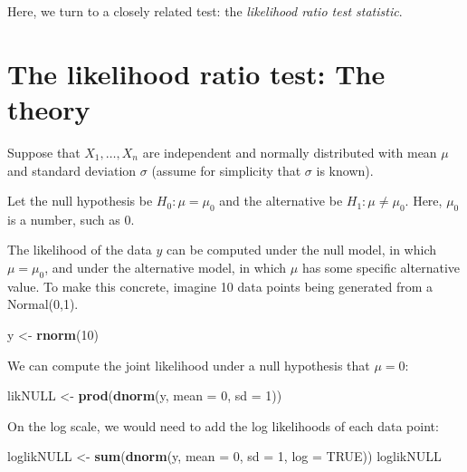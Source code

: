 \documentclass[12pt,]{krantz}
\newenvironment{Shaded}{\begin{snugshade}}{\end{snugshade}}
\newcommand{\DataTypeTok}[1]{\textcolor[rgb]{0.13,0.29,0.53}{#1}}
\newcommand{\DecValTok}[1]{\textcolor[rgb]{0.00,0.00,0.81}{#1}}
\newcommand{\KeywordTok}[1]{\textcolor[rgb]{0.13,0.29,0.53}{\textbf{#1}}}
\newcommand{\NormalTok}[1]{#1}
\newcommand{\OtherTok}[1]{\textcolor[rgb]{0.56,0.35,0.01}{#1}}
\newcommand{\StringTok}[1]{\textcolor[rgb]{0.31,0.60,0.02}{#1}}
\begin{document}
Here, we turn to a closely related test: the \emph{likelihood ratio test statistic}.

\hypertarget{the-likelihood-ratio-test-the-theory}{%
\section{The likelihood ratio test: The theory}\label{the-likelihood-ratio-test-the-theory}}

Suppose that \(X_1,\dots, X_n\) are independent and normally distributed with mean \(\mu\) and standard deviation \(\sigma\) (assume for simplicity that \(\sigma\) is known).

Let the null hypothesis be \(H_0: \mu=\mu_0\) and the alternative be \(H_1: \mu\neq \mu_0\). Here, \(\mu_0\) is a number, such as \(0\).

The likelihood of the data \(y\) can be computed under the null model, in which \(\mu=\mu_0\), and under the alternative model, in which \(\mu\) has some specific alternative value. To make this concrete, imagine 10 data points being generated from a Normal(0,1).

\begin{Shaded}
\begin{Highlighting}[]
\NormalTok{y <-}\StringTok{ }\KeywordTok{rnorm}\NormalTok{(}\DecValTok{10}\NormalTok{)}
\end{Highlighting}
\end{Shaded}

We can compute the joint likelihood under a null hypothesis that \(\mu=0\):

\begin{Shaded}
\begin{Highlighting}[]
\NormalTok{likNULL <-}\StringTok{ }\KeywordTok{prod}\NormalTok{(}\KeywordTok{dnorm}\NormalTok{(y, }\DataTypeTok{mean =} \DecValTok{0}\NormalTok{, }\DataTypeTok{sd =} \DecValTok{1}\NormalTok{))}
\end{Highlighting}
\end{Shaded}

On the log scale, we would need to add the log likelihoods of each data point:

\begin{Shaded}
\begin{Highlighting}[]
\NormalTok{loglikNULL <-}\StringTok{ }\KeywordTok{sum}\NormalTok{(}\KeywordTok{dnorm}\NormalTok{(y, }\DataTypeTok{mean =} \DecValTok{0}\NormalTok{, }\DataTypeTok{sd =} \DecValTok{1}\NormalTok{, }\DataTypeTok{log =} \OtherTok{TRUE}\NormalTok{))}
\NormalTok{loglikNULL}
\end{Highlighting}
\end{Shaded}
\end{document}
